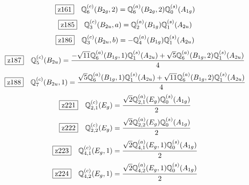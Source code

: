\documentclass[fleqn,10pt,landscape]{jsarticle}
\begin{document}
\begin{dmath*}
\hspace*{3mm}\fbox{z161}\quad \mathbb{Q}_{6}^{(c)}(B_{2g},2)=\mathbb{Q}_{6}^{(a)}(B_{2g},2) \mathbb{Q}_{0}^{(s)}(A_{1g})
\end{dmath*}
\begin{dmath*}
\hspace*{3mm}\fbox{z185}\quad \mathbb{Q}_{3}^{(c)}(B_{2u},a)=\mathbb{Q}_{2}^{(a)}(B_{1g}) \mathbb{Q}_{1}^{(s)}(A_{2u})
\end{dmath*}
\begin{dmath*}
\hspace*{3mm}\fbox{z186}\quad \mathbb{Q}_{3}^{(c)}(B_{2u},b)=- \mathbb{Q}_{4}^{(a)}(B_{1g}) \mathbb{Q}_{1}^{(s)}(A_{2u})
\end{dmath*}
\begin{dmath*}
\hspace*{3mm}\fbox{z187}\quad \mathbb{Q}_{5}^{(c)}(B_{2u})=\frac{- \sqrt{11} \mathbb{Q}_{6}^{(a)}(B_{1g},1) \mathbb{Q}_{1}^{(s)}(A_{2u}) + \sqrt{5} \mathbb{Q}_{6}^{(a)}(B_{1g},2) \mathbb{Q}_{1}^{(s)}(A_{2u})}{4}
\end{dmath*}
\begin{dmath*}
\hspace*{3mm}\fbox{z188}\quad \mathbb{Q}_{7}^{(c)}(B_{2u},1)=\frac{\sqrt{5} \mathbb{Q}_{6}^{(a)}(B_{1g},1) \mathbb{Q}_{1}^{(s)}(A_{2u}) + \sqrt{11} \mathbb{Q}_{6}^{(a)}(B_{1g},2) \mathbb{Q}_{1}^{(s)}(A_{2u})}{4}
\end{dmath*}
\begin{dmath*}
\hspace*{3mm}\fbox{z221}\quad \mathbb{Q}_{2,1}^{(c)}(E_{g})=\frac{\sqrt{2} \mathbb{Q}_{2,1}^{(a)}(E_{g}) \mathbb{Q}_{0}^{(s)}(A_{1g})}{2}
\end{dmath*}
\begin{dmath*}
\hspace*{3mm}\fbox{z222}\quad \mathbb{Q}_{2,2}^{(c)}(E_{g})=\frac{\sqrt{2} \mathbb{Q}_{2,2}^{(a)}(E_{g}) \mathbb{Q}_{0}^{(s)}(A_{1g})}{2}
\end{dmath*}
\begin{dmath*}
\hspace*{3mm}\fbox{z223}\quad \mathbb{Q}_{4,1}^{(c)}(E_{g},1)=\frac{\sqrt{2} \mathbb{Q}_{4,1}^{(a)}(E_{g},1) \mathbb{Q}_{0}^{(s)}(A_{1g})}{2}
\end{dmath*}
\begin{dmath*}
\hspace*{3mm}\fbox{z224}\quad \mathbb{Q}_{4,2}^{(c)}(E_{g},1)=\frac{\sqrt{2} \mathbb{Q}_{4,2}^{(a)}(E_{g},1) \mathbb{Q}_{0}^{(s)}(A_{1g})}{2}
\end{dmath*}
\end{document}
